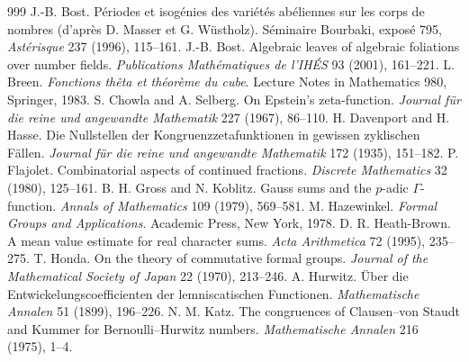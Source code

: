 \begin{thebibliography}{999}
 J.-B. Bost. P\'eriodes et isog\'enies des vari\'et\'es ab\'eliennes sur les corps de nombres (d'apr\`es D. Masser et G. W\"ustholz). S\'eminaire Bourbaki, expos\'e 795, \emph{Ast\'erisque} 237 (1996), 115--161.
 J.-B. Bost. Algebraic leaves of algebraic foliations over number fields. \emph{Publications Math\'ematiques de l'IH\'ES} 93 (2001), 161--221.
 L. Breen. \emph{Fonctions th\^eta et th\'eor\`eme du cube}. Lecture Notes in Mathematics 980, Springer, 1983.
 S. Chowla and A. Selberg. On Epstein's zeta-function. \emph{Journal f\"ur die reine und angewandte Mathematik} 227 (1967), 86--110.
 H. Davenport and H. Hasse. Die Nullstellen der Kongruenzzetafunktionen in gewissen zyklischen F\"allen. \emph{Journal f\"ur die reine und angewandte Mathematik} 172 (1935), 151--182.
 P. Flajolet. Combinatorial aspects of continued fractions. \emph{Discrete Mathematics} 32 (1980), 125--161.
 B. H. Gross and N. Koblitz. Gauss sums and the $p$-adic $\Gamma$-function. \emph{Annals of Mathematics} 109 (1979), 569--581.
 M. Hazewinkel. \emph{Formal Groups and Applications}. Academic Press, New York, 1978.
 D. R. Heath-Brown. A mean value estimate for real character sums. \emph{Acta Arithmetica} 72 (1995), 235--275.
 T. Honda. On the theory of commutative formal groups. \emph{Journal of the Mathematical Society of Japan} 22 (1970), 213--246.
 A. Hurwitz. \"Uber die Entwickelungscoefficienten der lemniscatischen Functionen. \emph{Mathematische Annalen} 51 (1899), 196--226.
 N. M. Katz. The congruences of Clausen--von Staudt and Kummer for Bernoulli--Hurwitz numbers. \emph{Mathematische Annalen} 216 (1975), 1--4.

\end{thebibliography}
